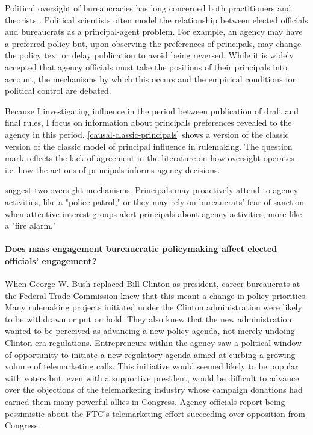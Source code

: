 Political oversight of bureaucracies has long concerned both practitioners and theorists \citep{Wilson1989}. Political scientists often model the relationship between elected officials and bureaucrats as a principal-agent problem. For example, an agency may have a preferred policy but, upon observing the preferences of principals, may change the policy text or delay publication to avoid being reversed. While it is widely accepted that agency officials must take the positions of their principals into account, the mechanisms by which this occurs and the empirical conditions for political control are debated.

Because I investigating influence in the period between publication of  draft and final rules, I focus on information about principals preferences revealed to the agency in this period. \ref{causal-classic-principals} shows a version of the classic version of the classic model of principal influence in rulemaking. The question mark reflects the lack of agreement in the literature on how oversight operates--i.e. how the actions of principals informs agency decisions. 






\citet{McCubbins1987} suggest two oversight mechanisms. Principals may proactively attend to agency activities, like a "police patrol," or they may rely on bureaucrats' fear of sanction when attentive interest groups alert principals about agency activities, more like a "fire alarm." 

\paragraph{Does mass engagement bureaucratic policymaking affect elected officials' engagement?}

When George W. Bush replaced Bill Clinton as president, career bureaucrats at the Federal Trade Commission knew that this meant a change in policy priorities. Many rulemaking projects initiated under the Clinton administration were likely to be withdrawn or put on hold. They also knew that the new administration wanted to be perceived as advancing a new policy agenda, not merely undoing Clinton-era regulations. Entrepreneurs within the agency saw a political window of opportunity to initiate a new regulatory agenda aimed at curbing a growing volume of telemarketing calls. This initiative would seemed likely to be popular with voters but, even with a supportive president, would be difficult to advance over the objections of the telemarketing industry whose campaign donations had earned them many powerful allies in Congress. Agency officials report being pessimistic about the FTC's telemarketing effort succeeding over opposition from Congress.

